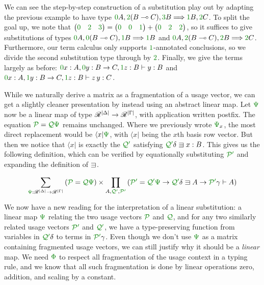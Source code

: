 We can see the step-by-step construction of a substitution play out by adapting
the previous example to have type
$\gr0A, \gr2(B \multimap C), \gr3B \Longrightarrow \gr1B, \gr2C$.
To split the goal up, we note that $
\begin{pmatrix} \gr0 & \gr2 & \gr3 \end{pmatrix} =
\begin{pmatrix} \gr0 & \gr0 & \gr1 \end{pmatrix} +
\begin{pmatrix} \gr0 & \gr2 & \gr2 \end{pmatrix}
$, so it suffices to give substitutions of types
$\gr0A, \gr0(B \multimap C), \gr1B \Longrightarrow \gr1B$ and
$\gr0A, \gr2(B \multimap C), \gr2B \Longrightarrow \gr2C$.
Furthermore, our term calculus only supports $\gr1$-annotated conclusions,
so we divide the second substitution type through by $\gr2$.
Finally, we give the terms largely as before:
$\gr0x : A, \gr0y : B \to C, \gr1z : B \vdash y : B$ and
$\gr0x : A, \gr1y : B \to C, \gr1z : B \vdash z\,y : C$.

While we naturally derive a matrix as a fragmentation of a usage vector, we can
get a slightly cleaner presentation by instead using an abstract linear map.
Let $\gr\Psi$ now be a linear map of type
$\mathscr R^{\left\lvert{\Delta}\right\rvert} \to \mathscr R^{\left\lvert{\Gamma}\right\rvert}$, with application written postfix.
The equation $\grP = \grQ\gr\Psi$ remains unchanged.
Where we previously wrote $\gr\Psi_x$, the most direct replacement would be
$\langle x \rvert\gr\Psi$, with $\langle x \rvert$ being the $x$th basis row
vector.
But then we notice that $\langle x \rvert$ is exactly the $\grQprime$ satisfying
$\grQprime\delta \sqni x : B$.
This gives us the following definition, which can be verified by equationally
substituting $\grPprime$ and expanding the definition of $\sqni$.

\begin{displaymath}
  \sum_{\gr\Psi : \Ann^{\size\Delta} \to \Ann^{\size\Gamma}}
    \left(\grP = \grQ\gr\Psi\right) \times
    \prod_{A,\grQprime,\grPprime} \left(
    \grPprime = \grQprime\gr\Psi \to \grQprime\delta \sqni A \to
    \grPprime\gamma \vdash A\right)
\end{displaymath}

We now have a new reading for the interpretation of a linear substitution:
a linear map $\gr\Psi$ relating the two usage vectors $\grP$ and $\grQ$, and
for any two similarly related usage vectors $\grPprime$ and $\grQprime$, we
have a type-preserving function from variables in $\grQprime\delta$ to terms in
$\grPprime\gamma$.
Even though we don't use $\gr\Psi$ as a matrix containing fragmented usage
vectors, we can still justify why it should be a \emph{linear} map.
We need $\gr\Phi$ to respect all fragmentation of the usage context in a typing
rule, and we know that all such fragmentation is done by linear operations
zero, addition, and scaling by a constant.

